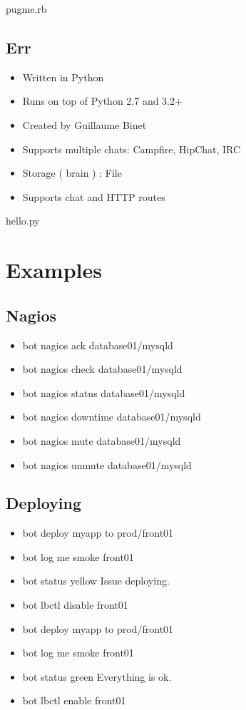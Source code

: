 \documentclass[
paper=128mm:96mm, %
fontsize=11pt, %
pagesize, %
parskip=half-, %
]{scrartcl} %
\theoremstyle{mythmstyle} %
\begin{document}

pugme.rb
\clearpage


\subsection{Err}
\begin{itemize}
\item Written in Python
\item Runs on top of Python 2.7 and 3.2+
\item Created by Guillaume Binet
\item Supports multiple chats: Campfire, HipChat, IRC
\item Storage ( brain ) : File
\item Supports chat and HTTP routes
\end{itemize}
\clearpage


hello.py
\clearpage


\section{Examples}
\subsection{Nagios}
\begin{itemize}
  \item bot nagios ack database01/mysqld
  \item bot nagios check database01/mysqld
  \item bot nagios status database01/mysqld
  \item bot nagios downtime database01/mysqld
  \item bot nagios mute database01/mysqld
  \item bot nagios unmute database01/mysqld
\end{itemize}
\clearpage


\subsection{Deploying}
\begin{itemize}
  \item bot deploy myapp to prod/front01
  \item bot log me smoke front01
  \item bot status yellow Issue deploying.
  \item bot lbctl disable front01
  \item bot deploy myapp to prod/front01
  \item bot log me smoke front01
  \item bot status green Everything is ok.
  \item bot lbctl enable front01
\end{itemize}
\clearpage
\end{document}
